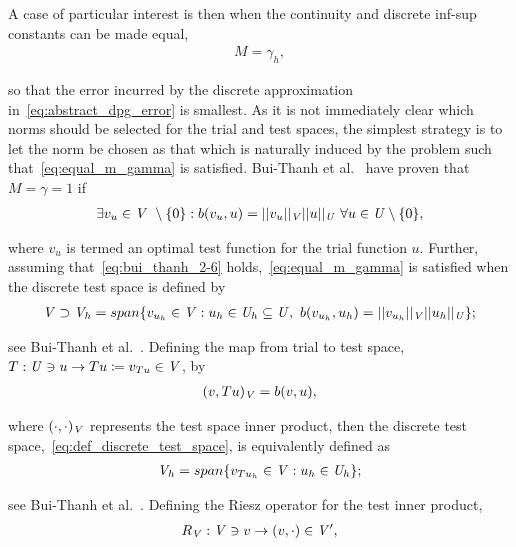 A case of particular interest is then when the continuity and discrete inf-sup constants can be made equal,
\begin{align} \label{eq:equal_m_gamma}
M = \gamma_h,
\end{align}

so that the error incurred by the discrete approximation in~\eqref{eq:abstract_dpg_error} is smallest. As it is not
immediately clear which norms should be selected for the trial and test spaces, the simplest strategy is to let the norm
be chosen as that which is naturally induced by the problem such that~\eqref{eq:equal_m_gamma} is satisfied. Bui-Thanh
et al.~\cite[Theorem ]{BuiThanh2013} have proven that $M = \gamma = 1$ if
\begin{align} \label{eq:bui_thanh_2-6}
\exists v_u \in \mathit{{{V}}}\ \setminus \{0\} :
b(v_u,u) = ||v_u||_{\mathit{{{V}}}} ||u||_{\mathit{{{U}}}}\ \forall u \in \mathit{{{U}}} \setminus \{0\},
\end{align}

where $v_u$ is termed an optimal test function for the trial function $u$. Further, assuming
that~\eqref{eq:bui_thanh_2-6} holds,~\eqref{eq:equal_m_gamma} is satisfied when the discrete test space is defined by
\begin{align} \label{eq:def_discrete_test_space}
\mathit{{{V}}} \supset \mathit{{{V}}}_h 
= span \{ v_{u_h} \in \mathit{{{V}}} : u_h \in \mathit{{{U}}}_h \subseteq \mathit{{{U}}},\ b(v_{u_h},u_h) 
= ||v_{u_h}||_{\mathit{{{V}}}} ||u_h||_{\mathit{{{U}}}} \};
\end{align}

see Bui-Thanh et al.~\cite[Lemma ]{BuiThanh2013}. Defining the map from trial to test space, $T :
\mathit{{{U}}} \ni u \rightarrow Tu \coloneqq v_{Tu} \in \mathit{{{V}}} $, by
\begin{align}
(v,Tu)_{\mathit{{{V}}}} = b(v,u),
\end{align}

where $(\cdot,\cdot)_{\mathit{{{V}}}}$ represents the test space inner product, then the discrete test
space,~\eqref{eq:def_discrete_test_space}, is equivalently defined as
\begin{align} \label{eq:def_discrete_test_space_alt}
\mathit{{{V}}}_h = span \{ v_{T u_h} \in \mathit{{{V}}} : u_h \in \mathit{{{U}}}_h \};
\end{align}

see Bui-Thanh et al.~\cite[Theorem ]{BuiThanh2013}. Defining the Riesz operator for the test inner
product,
\begin{align}
R_{\mathit{{{V}}}} : \mathit{{{V}}} \ni v \rightarrow (v,\cdot) \in \mathit{{{V}}}',
\end{align}

